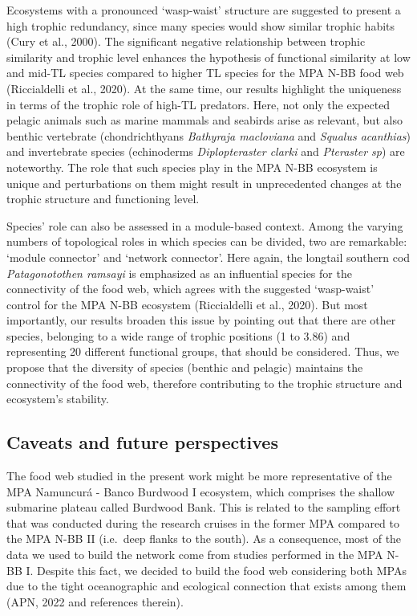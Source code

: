 \documentclass[preprint, 3p,
authoryear]{elsarticle} %
\begin{document}
Ecosystems with a pronounced `wasp-waist' structure are suggested to
present a high trophic redundancy, since many species would show similar
trophic habits (Cury et al., 2000). The significant negative
relationship between trophic similarity and trophic level enhances the
hypothesis of functional similarity at low and mid-TL species compared
to higher TL species for the MPA N-BB food web (Riccialdelli et al.,
2020). At the same time, our results highlight the uniqueness in terms
of the trophic role of high-TL predators. Here, not only the expected
pelagic animals such as marine mammals and seabirds arise as relevant,
but also benthic vertebrate (chondrichthyans \emph{Bathyraja macloviana}
and \emph{Squalus acanthias}) and invertebrate species (echinoderms
\emph{Diplopteraster clarki} and \emph{Pteraster sp}) are noteworthy.
The role that such species play in the MPA N-BB ecosystem is unique and
perturbations on them might result in unprecedented changes at the
trophic structure and functioning level.

Species' role can also be assessed in a module-based context. Among the
varying numbers of topological roles in which species can be divided,
two are remarkable: `module connector' and `network connector'. Here
again, the longtail southern cod \emph{Patagonotothen ramsayi} is
emphasized as an influential species for the connectivity of the food
web, which agrees with the suggested `wasp-waist' control for the MPA
N-BB ecosystem (Riccialdelli et al., 2020). But most importantly, our
results broaden this issue by pointing out that there are other species,
belonging to a wide range of trophic positions (1 to 3.86) and
representing 20 different functional groups, that should be considered.
Thus, we propose that the diversity of species (benthic and pelagic)
maintains the connectivity of the food web, therefore contributing to
the trophic structure and ecosystem's stability.

\hypertarget{caveats-and-future-perspectives}{%
\subsection{Caveats and future
perspectives}\label{caveats-and-future-perspectives}}

The food web studied in the present work might be more representative of
the MPA Namuncurá - Banco Burdwood I ecosystem, which comprises the
shallow submarine plateau called Burdwood Bank. This is related to the
sampling effort that was conducted during the research cruises in the
former MPA compared to the MPA N-BB II (i.e.~deep flanks to the south).
As a consequence, most of the data we used to build the network come
from studies performed in the MPA N-BB I. Despite this fact, we decided
to build the food web considering both MPAs due to the tight
oceanographic and ecological connection that exists among them (APN,
2022 and references therein).
\end{document}
